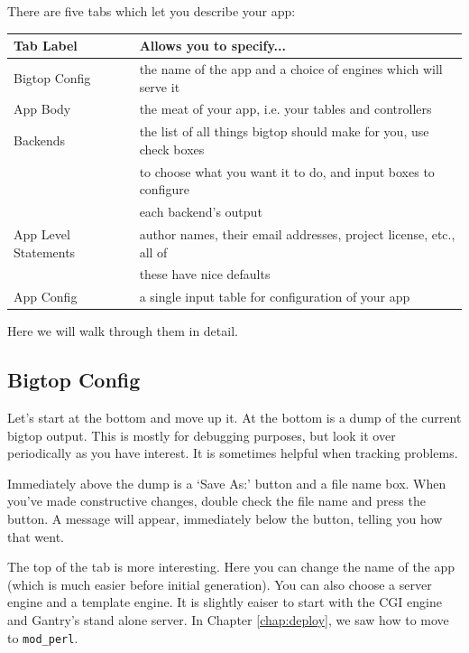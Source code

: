 There are five tabs which let you describe your app:

\begin{tabular}{l|l}
Tab Label & Allows you to specify... \\
\hline
Bigtop Config &
    the name of the app and a choice of engines which will serve it \\

App Body &
    the meat of your app, i.e. your tables and controllers \\

Backends &
    the list of all things bigtop should make for you, use check boxes \\
 &  to choose what you want it to do, and input boxes to configure \\
 &  each backend's output \\

App Level Statements &
    author names, their email addresses, project license, etc., all of \\
 &  these have nice defaults \\

App Config &
    a single input table for configuration of your app \\
\end{tabular}

Here we will walk through them in detail.

\subsection*{Bigtop Config}

Let's start at the bottom and move up it.  At the bottom is a dump of the
current bigtop output.  This is mostly for debugging purposes, but look
it over periodically as you have interest.  It is sometimes helpful
when tracking problems.

Immediately above the dump is a `Save As:' button and a file name
box.  When you've made constructive changes, double check the file name and
press the button.  A message will appear, immediately below the button,
telling you how that went.

The top of the tab is more interesting.  Here you can change the name of the
app (which is much easier before initial generation).  You can also choose
a server engine and a template engine.  It is slightly eaiser to start with
the CGI engine and Gantry's stand alone server.  In Chapter \ref{chap:deploy},
we saw how to move to \verb+mod_perl+.

